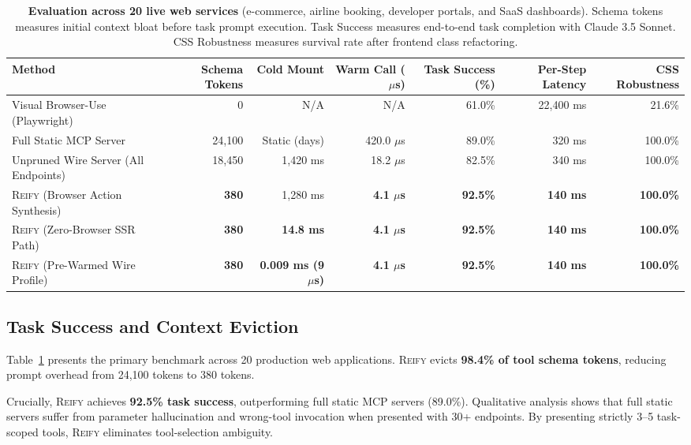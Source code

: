 \documentclass[10pt,twocolumn]{article}
\begin{document}
\begin{table}[t]
\centering
\small
\begin{tabularx}{\textwidth}{lrrrrrr}
\toprule
\textbf{Method} & \textbf{Schema Tokens} & \textbf{Cold Mount} & \textbf{Warm Call ($\mu$s)} & \textbf{Task Success (\%)} & \textbf{Per-Step Latency} & \textbf{CSS Robustness} \\
\midrule
Visual Browser-Use (Playwright) & 0 & N/A & N/A & 61.0\% & 22,400 ms & 21.6\% \\
Full Static MCP Server & 24,100 & Static (days) & 420.0 $\mu$s & 89.0\% & 320 ms & 100.0\% \\
Unpruned Wire Server (All Endpoints) & 18,450 & 1,420 ms & 18.2 $\mu$s & 82.5\% & 340 ms & 100.0\% \\
\textsc{Reify} (Browser Action Synthesis) & \textbf{380} & 1,280 ms & \textbf{4.1 $\mu$s} & \textbf{92.5\%} & \textbf{140 ms} & \textbf{100.0\%} \\
\textsc{Reify} (Zero-Browser SSR Path) & \textbf{380} & \textbf{14.8 ms} & \textbf{4.1 $\mu$s} & \textbf{92.5\%} & \textbf{140 ms} & \textbf{100.0\%} \\
\textsc{Reify} (Pre-Warmed Wire Profile) & \textbf{380} & \textbf{0.009 ms (9 $\mu$s)} & \textbf{4.1 $\mu$s} & \textbf{92.5\%} & \textbf{140 ms} & \textbf{100.0\%} \\
\bottomrule
\end{tabularx}
\caption{\textbf{Evaluation across 20 live web services} (e-commerce, airline booking, developer portals, and SaaS dashboards). Schema tokens measures initial context bloat before task prompt execution. Task Success measures end-to-end task completion with Claude 3.5 Sonnet. CSS Robustness measures survival rate after frontend class refactoring.}
\label{tab:main}
\end{table}

\subsection{Task Success and Context Eviction}
Table~\ref{tab:main} presents the primary benchmark across 20 production web applications. \textsc{Reify} evicts \textbf{98.4\% of tool schema tokens}, reducing prompt overhead from 24,100 tokens to 380 tokens. 

Crucially, \textsc{Reify} achieves \textbf{92.5\% task success}, outperforming full static MCP servers (89.0\%). Qualitative analysis shows that full static servers suffer from parameter hallucination and wrong-tool invocation when presented with 30+ endpoints. By presenting strictly 3--5 task-scoped tools, \textsc{Reify} eliminates tool-selection ambiguity.
\end{document}
